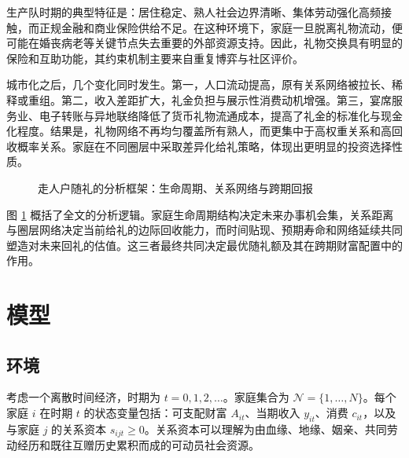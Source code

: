 \documentclass[12pt,a4paper]{ctexart}
\begin{document}
生产队时期的典型特征是：居住稳定、熟人社会边界清晰、集体劳动强化高频接触，而正规金融和商业保险供给不足。在这种环境下，家庭一旦脱离礼物流动，便可能在婚丧病老等关键节点失去重要的外部资源支持。因此，礼物交换具有明显的保险和互助功能，其约束机制主要来自重复博弈与社区评价。

城市化之后，几个变化同时发生。第一，人口流动提高，原有关系网络被拉长、稀释或重组。第二，收入差距扩大，礼金负担与展示性消费动机增强。第三，宴席服务业、电子转账与异地联络降低了货币礼物流通成本，提高了礼金的标准化与现金化程度。结果是，礼物网络不再均匀覆盖所有熟人，而更集中于高权重关系和高回收概率关系。家庭在不同圈层中采取差异化给礼策略，体现出更明显的投资选择性质。

\begin{figure}[htbp]
\centering
{}
\caption{走人户随礼的分析框架：生命周期、关系网络与跨期回报}
\label{fig:framework}
\end{figure}

图 \ref{fig:framework} 概括了全文的分析逻辑。家庭生命周期结构决定未来办事机会集，关系距离与圈层网络决定当前给礼的边际回收能力，而时间贴现、预期寿命和网络延续共同塑造对未来回礼的估值。这三者最终共同决定最优随礼额及其在跨期财富配置中的作用。

\section{模型}
\label{sec:model}

\subsection{环境}

考虑一个离散时间经济，时期为 $t=0,1,2,\dots$。家庭集合为 $\mathcal{N}=\{1,\dots,N\}$。每个家庭 $i$ 在时期 $t$ 的状态变量包括：可支配财富 $A_{it}$、当期收入 $y_{it}$、消费 $c_{it}$，以及与家庭 $j$ 的关系资本 $s_{ijt}\geq 0$。关系资本可以理解为由血缘、地缘、姻亲、共同劳动经历和既往互赠历史累积而成的可动员社会资源。
\end{document}
